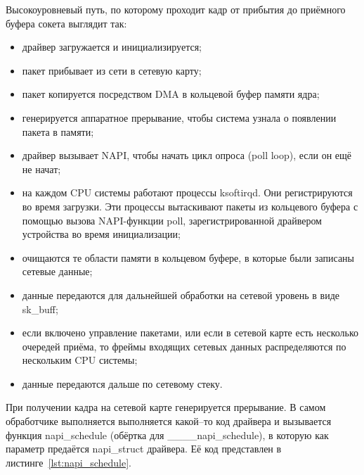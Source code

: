 Высокоуровневый путь, по которому проходит кадр от прибытия до приёмного буфера сокета выглядит так:
\begin{itemize}[label=---]
	\item драйвер загружается и инициализируется;
	\item пакет прибывает из сети в сетевую карту;
	\item пакет копируется посредством DMA в кольцевой буфер памяти ядра;
	\item генерируется аппаратное прерывание, чтобы система узнала о появлении пакета в памяти;
	\item драйвер вызывает NAPI, чтобы начать цикл опроса (poll loop), если он ещё не начат;
	\item на каждом CPU системы работают процессы ksoftirqd. Они регистрируются во время загрузки. Эти процессы вытаскивают пакеты из кольцевого буфера с помощью вызова NAPI-функции poll, зарегистрированной драйвером устройства во время инициализации;
	\item очищаются те области памяти в кольцевом буфере, в которые были записаны сетевые данные;
	\item данные передаются для дальнейшей обработки на сетевой уровень в виде sk\_buff;
	\item если включено управление пакетами, или если в сетевой карте есть несколько очередей приёма, то фреймы входящих сетевых данных распределяются по нескольким CPU системы;
	\item данные передаются дальше по сетевому стеку.
\end{itemize}

При получении кадра на сетевой карте генерируется прерывание. В самом обработчике выполняется выполняется какой--то код драйвера и вызывается функция napi\_schedule (обёртка для \_\_\_\_napi\_schedule), в которую как параметр предаётся napi\_struct драйвера. Её код представлен в листинге~\ref{lst:napi_schedule}.

